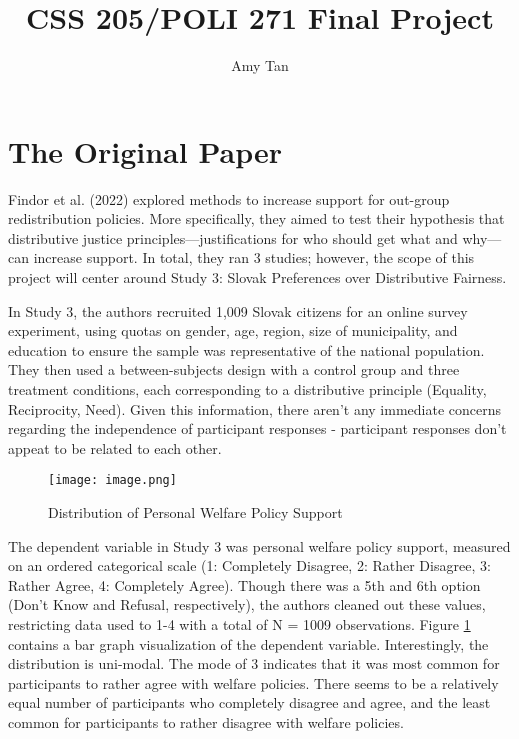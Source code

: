 \documentclass{article}
\title{CSS 205/POLI 271 Final Project}
\author{Amy Tan}
\begin{document}
\maketitle

\section{The Original Paper}

Findor et al. (2022) explored methods to increase support for out-group redistribution policies. More specifically, they aimed to test their hypothesis that distributive justice principles—justifications for who should get what and why—can increase support. In total, they ran 3 studies; however, the scope of this project will center around Study 3: Slovak Preferences over Distributive Fairness. 

In Study 3, the authors recruited 1,009 Slovak citizens for an online survey experiment, using quotas on gender, age, region, size of municipality, and education to ensure the sample was representative of the national population. They then used a between-subjects design with a control group and three treatment conditions, each corresponding to a distributive principle (Equality, Reciprocity, Need). Given this information, there aren't any immediate concerns regarding the independence of participant responses - participant responses don't appeat to be related to each other. 

\begin{figure}
    \centering
    \texttt{[image: image.png]}
    \caption{Distribution of Personal Welfare Policy Support}
    \label{fig:dv_distribution}
\end{figure}

The dependent variable in Study 3 was personal welfare policy support, measured on an ordered categorical scale (1: Completely Disagree, 2: Rather Disagree, 3: Rather Agree, 4: Completely Agree). Though there was a 5th and 6th option (Don't Know and Refusal, respectively), the authors cleaned out these values, restricting data used to 1-4 with a total of N = 1009 observations. Figure \ref{fig:dv_distribution} contains a bar graph visualization of the dependent variable. Interestingly, the distribution is uni-modal. The mode of 3 indicates that it was most common for participants to rather agree with welfare policies. There seems to be a relatively equal number of participants who completely disagree and agree, and the least common for participants to rather disagree with welfare policies.
\end{document}

